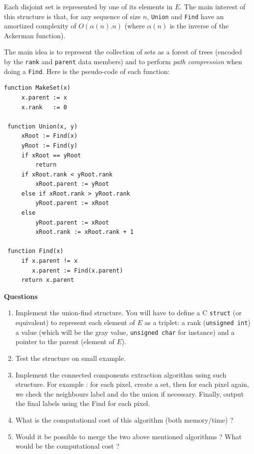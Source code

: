 \documentclass[a4paper, 11pt, french]{article}
\begin{document}
\par Each disjoint set is represented by one of its elements in $E$. The main interest of this structure is that, for any sequence of size $n$, \texttt{Union} and \texttt{Find} have an amortized complexity of $O(\alpha(n).n)$ (where $\alpha(n)$ is the inverse of the Ackerman function). 

\par The main idea is to represent the collection of sets as a forest of trees (encoded by the \texttt{rank} and \texttt{parent} data members) and to perform \emph{path compression} when doing a \texttt{Find}. Here is the pseudo-code of each function:
\begin{verbatim}
function MakeSet(x)
     x.parent := x
     x.rank   := 0
 
 function Union(x, y)
     xRoot := Find(x)
     yRoot := Find(y)
     if xRoot == yRoot
         return
     if xRoot.rank < yRoot.rank
         xRoot.parent := yRoot
     else if xRoot.rank > yRoot.rank
         yRoot.parent := xRoot
     else
         yRoot.parent := xRoot
         xRoot.rank := xRoot.rank + 1
         
 function Find(x)
     if x.parent != x
        x.parent := Find(x.parent)
     return x.parent
\end{verbatim}

\smallskip
{\bf Questions}
\begin{enumerate}
	\item Implement the union-find structure. You will have to define a C \texttt{struct} (or equivalent) to represent each element of $E$ as a triplet: a rank (\texttt{unsigned int}) a value (which will be the gray value, \texttt{unsigned char} for instance) and a pointer to the parent (element of $E$).
	\item Test the structure on small example.
	\item Implement the connected components extraction algorithm using such structure. For example :  for each pixel, create a set, then for each pixel again, we check the neighbours label and do the union if necessary. Finally, output the final labels using the Find for each pixel.
	\item What is the computational cost of this algorithm (both memory/time) ?  
	\item Would it be possible to merge the two above mentioned algorithms ? What would be the computational cost ?
\end{enumerate}
\end{document}
